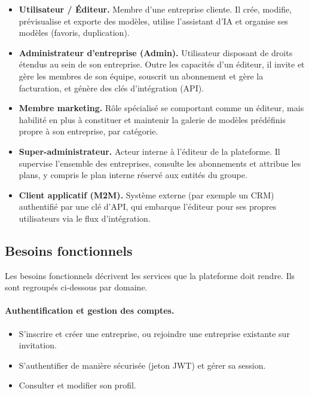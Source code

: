 \begin{itemize}[leftmargin=1.4cm]
  \item \textbf{Utilisateur / Éditeur.} Membre d'une entreprise cliente. Il
  crée, modifie, prévisualise et exporte des modèles, utilise l'assistant
  d'IA et organise ses modèles (favoris, duplication).

  \item \textbf{Administrateur d'entreprise (Admin).} Utilisateur disposant
  de droits étendus au sein de son entreprise. Outre les capacités d'un
  éditeur, il invite et gère les membres de son équipe, souscrit un
  abonnement et gère la facturation, et génère des clés d'intégration
  (API).

  \item \textbf{Membre marketing.} Rôle spécialisé se comportant comme un
  éditeur, mais habilité en plus à constituer et maintenir la galerie de
  modèles prédéfinis propre à son entreprise, par catégorie.

  \item \textbf{Super-administrateur.} Acteur interne à l'éditeur de la
  plateforme. Il supervise l'ensemble des entreprises, consulte les
  abonnements et attribue les plans, y compris le plan interne réservé aux
  entités du groupe.

  \item \textbf{Client applicatif (M2M).} Système externe (par exemple un
  CRM) authentifié par une clé d'API, qui embarque l'éditeur pour ses
  propres utilisateurs via le flux d'intégration.
\end{itemize}

\subsection{Besoins fonctionnels}
Les besoins fonctionnels décrivent les services que la plateforme doit
rendre. Ils sont regroupés ci-dessous par domaine.

\paragraph{Authentification et gestion des comptes.}
\begin{itemize}[leftmargin=1.4cm,nosep]
  \item S'inscrire et créer une entreprise, ou rejoindre une entreprise
  existante sur invitation.
  \item S'authentifier de manière sécurisée (jeton JWT) et gérer sa
  session.
  \item Consulter et modifier son profil.
\end{itemize}

